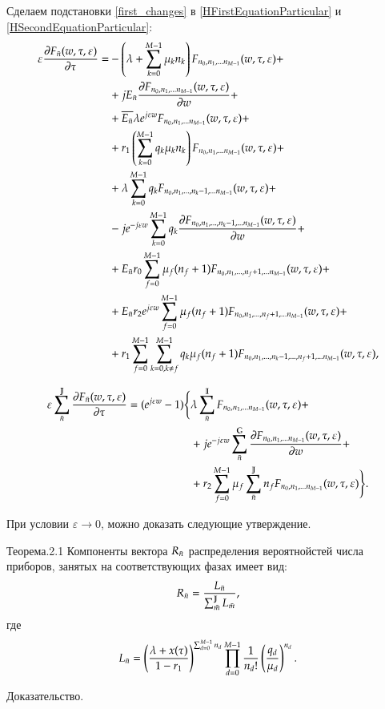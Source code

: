 Сделаем подстановки \eqref{first_changes} в 
\eqref{HFirstEquationParticular} и \eqref{HSecondEquationParticular}:
\begin{equation}\begin{aligned}
\label{FFirstEquationParticular}
\varepsilon \pdv{{F}_{\bar{n}}(w,\tau,\varepsilon)}{\tau}=
    &-\left( {\lambda+\sum_{{k}=0}^{M-1}\mu_{k}{n}_{k}} \right){F}_{{n}_0, {n}_1, ... {n}_{M-1}}(w,\tau,\varepsilon)+\\
    &+j E_{\bar{n}} \pdv{ {F}_{{n}_0, {n}_1, ... {n}_{M-1}} (w,\tau,\varepsilon)}{w}(i,\tau) + \\
    &+\overline{E_{\bar{n}}} \lambda e^{j\varepsilon w} {F}_{{n}_0, {n}_1, ... {n}_{M-1}}(w,\tau,\varepsilon)+\\
    &+r_1 \left( {\sum_{{k}=0}^{M-1} q_{k}\mu_{k}{n}_{k}} \right) {F}_{{n}_0, {n}_1, ... {n}_{M-1}}(w,\tau,\varepsilon) + \\
    &+\lambda\sum_{k=0}^{M-1}q_k {F}_{{n}_0, {n}_1, ... , {n}_{k} - 1, ... {n}_{M-1}}(w,\tau,\varepsilon) + \\
    &-j  e^{-j\varepsilon w} \sum_{k=0}^{M-1}q_k \pdv{ {F}_{{n}_0, {n}_1, ... , {n}_{k} - 1, ... {n}_{M-1}} (w,\tau,\varepsilon)}{w} + \\
    &+E_{\bar{n}} r_0 \sum_{f=0}^{M-1} \mu_f (n_f + 1) {F}_{{n}_0, {n}_1, ... , {n}_{f} + 1, ... {n}_{M-1}}(w,\tau,\varepsilon) + \\
    &+E_{\bar{n}} r_2 e^{j\varepsilon w} \sum_{f=0}^{M-1} \mu_f (n_f + 1) {F}_{{n}_0, {n}_1, ... , {n}_{f} + 1, ... {n}_{M-1}}(w,\tau,\varepsilon) + \\
    &+r_1 \sum_{{f}=0}^{M-1} \sum_{{k}=0, {k} \neq {f}}^{M-1}
        q_k \mu_f (n_f+1) {F}_{{n}_0, {n}_1, ... , {n}_{k} - 1, ... , {n}_{f} + 1, ... {n}_{M-1}}(w,\tau,\varepsilon),
\end{aligned}\end{equation}

\begin{equation}\begin{aligned}\label{FSecondEquationParticular}
\varepsilon \sum_{\bar{n}}^{\mathbb{J}} \pdv{{F}_{\bar{n}}(w,\tau,\varepsilon)}{\tau}=(e^{j \varepsilon w} - 1)
\Bigg\{
    &\lambda \sum_{\bar{n}}^{\mathbb{I}} {F}_{{n}_0, {n}_1, ... {n}_{M-1}}(w,\tau,\varepsilon)+\\
    &+j e^{-j \varepsilon w} \sum_{\bar{n}}^{\mathbb{G}}\pdv{ {F}_{{n}_0, {n}_1, ... {n}_{M-1}} (w,\tau,\varepsilon)}{w} + \\
    &+r_2\sum_{f=0}^{M-1} \mu_f \sum_{\bar{n}}^{\mathbb{J}} n_f {F}_{{n}_0, {n}_1, ... {n}_{M-1}}(w,\tau,\varepsilon)
\Bigg\}
.
\end{aligned}\end{equation}

При условии \(\varepsilon \rightarrow 0\), можно
доказать следующие утверждение.

Теорема.2.1 Компоненты вектора \(R_{\bar{n}}\) распределения вероятнойстей
числа приборов, занятых на соответствующих фазах имеет вид:
\[R_{\bar{n}} = \frac{L_{\bar{n}}}{\sum_{\bar{m}}^{\mathbb{J}}L_{\bar{m}}},\]
где
\[L_{\bar{n}} = \left( {\frac{\lambda + x(\tau)}{1-r_1}} \right)^{ \sum_{d=0}^{M-1}{n}_{d} } \prod_{{d}=0}^{M-1} \frac{1}{{n}_{d}!} \left( {\frac{q_{d}}{\mu_{d}}} \right)^{{n}_{d}}.\]

Доказательство.
